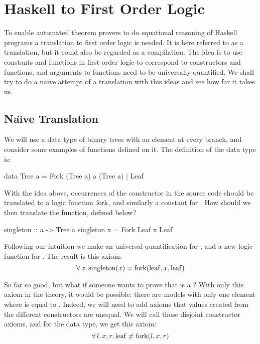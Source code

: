 \chapter{Haskell to First Order Logic}
\label{ch:translation}

To enable automated theorem provers to do equational reasoning of
Haskell programs a translation to first order logic is needed. It is
here referred to as a translation, but it could also be regarded as a
compilation. The idea is to use constants and functions in first order
logic to correspond to constructors and functions, and arguments to
functions need to be universally quantified. We shall try to do a
na\"{\i}ve attempt of a translation with this ideas and see how far it
takes us.

\section{Na\"{\i}ve Translation}
\label{sec:treetrans}

We will use a data type of binary trees with an element at every
branch, and consider some examples of functions defined on it. The
definition of the data type is:

\begin{code}
data Tree a = Fork (Tree a) a (Tree a) | Leaf
\end{code}

\noindent
With the idea above, occurrences of the  constructor in the
source code should be translated to a logic function $\mathrm{fork}$, and
similarly a constant for . How should we then translate the
 function, defined below?

\begin{code}
singleton :: a -> Tree a
singleton x = Fork Leaf x Leaf
\end{code}

\noindent
Following our intuition we make an universal quantification for
, and a new logic function for . The result
is this axiom:
\begin{equation*}
\forall \, x . \, \mathrm{singleton}(x) = \mathrm{fork}(\mathrm{leaf},x,\mathrm{leaf})
\end{equation*}

\noindent
So far so good, but what if someone wants to prove that 
is a ? With only this axiom in the theory, it would be
possible: there are models with only one element where  is
equal to . Indeed, we will need to add axioms that values
created from the different constructors are unequal. We will call
those disjoint constructor axioms, and for the  data type, we
get this axiom:
\begin{equation*}
\forall \, l , x , r . \, \mathrm{leaf} \neq \mathrm{fork}(l,x,r)
\end{equation*}

